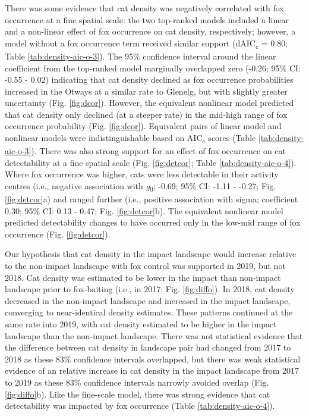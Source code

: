 \documentclass[11pt,a4paper,titlepage,twoside,openright]{style/unimelbthesis}
\begin{document}
\begin{mainmatter}
There was some evidence that cat density was negatively correlated with fox occurrence at a fine spatial scale: the two top-ranked models included a linear and a non-linear effect of fox occurrence on cat density, respectively; however, a model without a fox occurrence term received similar support (dAIC\textsubscript{c} = 0.80; Table \ref{tab:density-aic-o-3}). The 95\% confidence interval around the linear coefficient from the top-ranked model marginally overlapped zero (-0.26; 95\% CI: -0.55 - 0.02) indicating that cat density declined as fox occurrence probabilities increased in the Otways at a similar rate to Glenelg, but with slightly greater uncertainty (Fig. \ref{fig:dcor}). However, the equivalent nonlinear model predicted that cat density only declined (at a steeper rate) in the mid-high range of fox occurrence probability (Fig. \ref{fig:dcor}). Equivalent pairs of linear model and nonlinear models were indistinguishable based on AIC\textsubscript{c} scores (Table \ref{tab:density-aic-o-3}). There was also strong support for an effect of fox occurrence on cat detectability at a fine spatial scale (Fig. \ref{fig:detcor}; Table \ref{tab:density-aic-o-4}). Where fox occurrence was higher, cats were less detectable in their activity centres (i.e., negative association with \emph{g}\textsubscript{0}; -0.69; 95\% CI: -1.11 - -0.27; Fig. \ref{fig:detcor}a) and ranged further (i.e., positive association with sigma; coefficient 0.30; 95\% CI: 0.13 - 0.47; Fig. \ref{fig:detcor}b). The equivalent nonlinear model predicted detectability changes to have occurred only in the low-mid range of fox occurrence (Fig. \ref{fig:detcor}).

Our hypothesis that cat density in the impact landscape would increase relative to the non-impact landscape with fox control was supported in 2019, but not 2018. Cat density was estimated to be lower in the impact than non-impact landscape prior to fox-baiting (i.e., in 2017; Fig. \ref{fig:diffo}). In 2018, cat density decreased in the non-impact landscape and increased in the impact landscape, converging to near-identical density estimates. These patterns continued at the same rate into 2019, with cat density estimated to be higher in the impact landscape than the non-impact landscape. There was not statistical evidence that the difference between cat density in landscape pair had changed from 2017 to 2018 as these 83\% confidence intervals overlapped, but there was weak statistical evidence of an relative increase in cat density in the impact landscape from 2017 to 2019 as these 83\% confidence intervals narrowly avoided overlap (Fig. \ref{fig:diffo}b). Like the fine-scale model, there was strong evidence that cat detectability was impacted by fox occurrence (Table \ref{tab:density-aic-o-4}).


\end{mainmatter}
\end{document}
